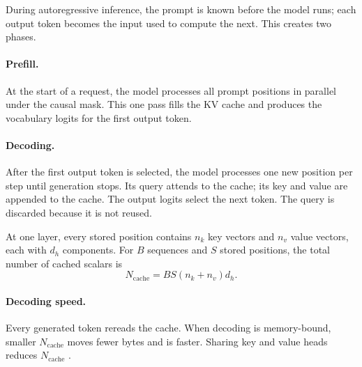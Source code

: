 \documentclass[11pt]{article}
\begin{document}
\begin{samepage}
During autoregressive inference, the prompt is known before the model runs; each
output token becomes the input used to compute the next.  This creates two phases.

\paragraph{Prefill.}
At the start of a request, the model processes all prompt positions in parallel
under the causal mask.  This one pass fills the KV cache and produces the
vocabulary logits for the first output token.

\paragraph{Decoding.}
After the first output token is selected, the model processes one new position
per step until generation stops.  Its query attends to the cache; its key and
value are appended to the cache.  The output logits select the next token.  The
query is discarded because it is not reused.

At one layer, every stored position contains $n_k$ key vectors and $n_v$ value
vectors, each with $d_h$ components.  For $B$ sequences and $S$ stored positions,
the total number of cached scalars is
\begin{equation}
  N_{\mathrm{cache}}=BS(n_k+n_v)d_h.
  \label{eq:kv-cache-count}
\end{equation}

\paragraph{Decoding speed.}
Every generated token rereads the cache.  When decoding is memory-bound, smaller
$N_{\mathrm{cache}}$ moves fewer bytes and is faster.  Sharing key and value heads
reduces $N_{\mathrm{cache}}$ \citep{hashimoto2026architecture}.
\end{samepage}

\begin{center}
\end{center}
\end{document}
